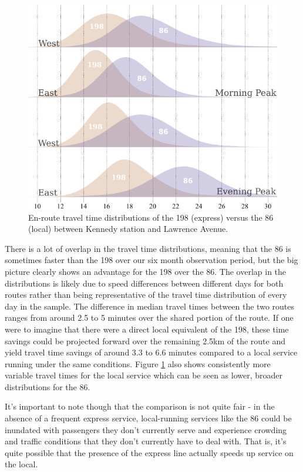 \documentclass{article}
\begin{document}
		\begin{figure}[h]
			\centering
			\includegraphics{figures/198_vs_86_kennedy_lawrence}
			\caption{En-route travel time distributions of the 198 (express) versus the 86 (local) between Kennedy station and Lawrence Avenue.}
			\label{fig:198_vs_86}
		\end{figure}

		There is a lot of overlap in the travel time distributions, meaning that the 86 is sometimes faster than the 198 over our six month observation period, but the big picture clearly shows an advantage for the 198 over the 86. The overlap in the distributions is likely due to speed differences between different days for both routes rather than being representative of the travel time distribution of every day in the sample. 
		The difference in median travel times between the two routes ranges from around 2.5 to 5 minutes over the shared portion of the route. 
		If one were to imagine that there were a direct local equivalent of the 198, these time savings could be projected forward over the remaining 2.5km of the route and yield travel time savings of around 3.3 to 6.6 minutes compared to a local service running under the same conditions.
		Figure \ref{fig:198_vs_86} also shows consistently more variable travel times for the local service which can be seen as lower, broader distributions for the 86. 
		
		It's important to note though that the comparison is not quite fair - in the absence of a frequent express service, local-running services like the 86 could be inundated with passengers they don't currently serve and experience crowding and traffic conditions that they don't currently have to deal with. That is, it's quite possible that the presence of the express line actually speeds up service on the local. 
		
\end{document}
